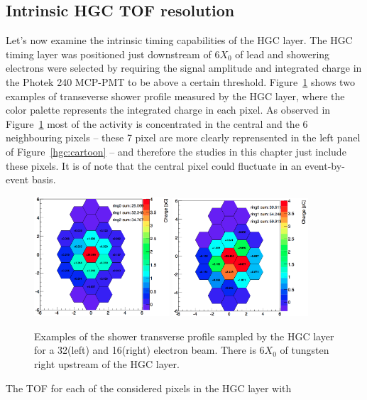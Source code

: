 \subsection{Intrinsic HGC TOF resolution}
Let's now examine the intrinsic timing capabilities of the HGC
layer. The HGC timing layer was positioned just downstream of 6$X_{0}$
of lead and showering electrons were selected by requiring the
signal amplitude and integrated charge in the Photek 240 MCP-PMT to be
above a certain threshold. Figure~\ref{hgc:showerprofile} shows two
examples of transeverse shower profile measured by the HGC layer,
where the color palette represents the integrated charge in each
pixel. As observed in Figure~\ref{hgc:showerprofile} most of the
activity is concentrated in the central and the 6 neighbouring pixels
-- these 7 pixel are more clearly reprensented in the left panel of
Figure~\ref{hgc:cartoon} -- and therefore the studies in this chapter
just include these pixels. It is of note that the central pixel could
fluctuate in an event-by-event basis. 
\begin{figure}[h] 
\centering
\includegraphics[width=0.45\textwidth]{HGC/tungsten_1mm_16.png} 
\includegraphics[width=0.45\textwidth]{HGC/tungsten_1mm_32.png} 
\caption{Examples of the shower transverse profile sampled by the HGC
  layer for a 32\GeV(left) and 16\GeV (right) electron beam. There is
  6$X_{0}$ of tungsten right upstream of the HGC layer.} 
\label{hgc:showerprofile} 
\end{figure}
The TOF for each of the considered pixels in the HGC layer with
